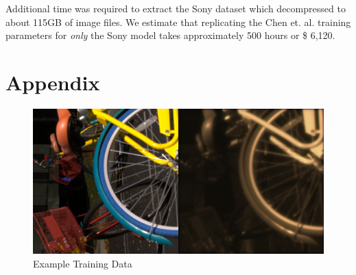 \documentclass{article}
\begin{document}
Additional time was required to extract the Sony dataset
which decompressed to about 115GB of image files. We estimate that
replicating the Chen et. al. \cite{chen2018learning} training parameters
for \textit{only} the Sony model takes approximately 500 hours or
\$ 6,120.

\section{Appendix}

\begin{figure}[ht]
  \centering
  \includegraphics[scale=0.1]{00002_00_train_100}
  \caption{\label{train} Example Training Data}
\end{figure}




\end{document}
